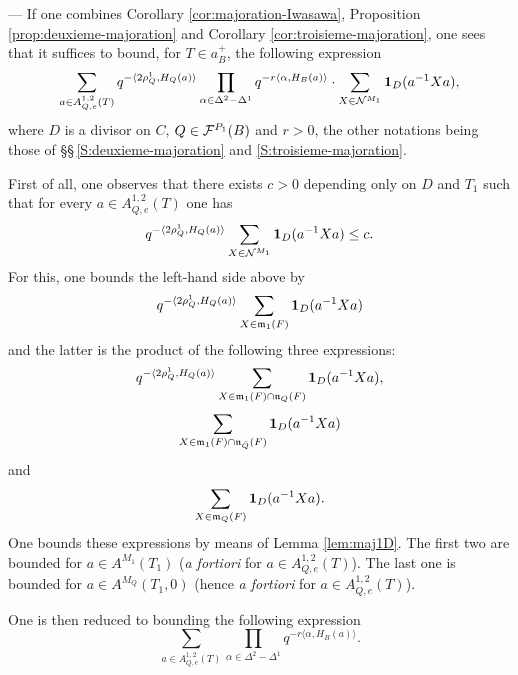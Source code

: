 \begin{paragr} --- \label{S:preuve-prop641} If one combines Corollary \ref{cor:majoration-Iwasawa}, Proposition \ref{prop:deuxieme-majoration} and Corollary \ref{cor:troisieme-majoration}, one sees that it suffices to bound, for $T\in a_B^+$, the following expression
$$\sum_{a\in A^{1,2}_{Q,e}(T)} q^{-\langle 2\rho_Q^1,H_Q(a)\rangle} \prod_{\alpha\in \Delta^2-\Delta^1} q^{-r\langle \alpha,H_B(a)\rangle}\cdot \sum_{X\in \mathcal{N}^{M_1}} \mathbf{1}_D(a^{-1}Xa),$$
where $D$ is a divisor on $C$, $Q\in \mathcal{F}^{P_1}(B)$ and $r>0$, the other notations being those of \S\S\,\ref{S:deuxieme-majoration} and \ref{S:troisieme-majoration}.

First of all, one observes that there exists $c>0$ depending only on $D$ and $T_1$ such that for every $a\in A^{1,2}_{Q,e}(T)$ one has
$$q^{-\langle 2\rho_Q^1,H_Q(a)\rangle} \sum_{X\in \mathcal{N}^{M_1}} \mathbf{1}_D(a^{-1}Xa)\leq c.$$
For this, one bounds the left-hand side above by
$$q^{-\langle 2\rho_Q^1,H_Q(a)\rangle} \sum_{X\in \mathfrak{m}_1(F)} \mathbf{1}_D(a^{-1}Xa)$$
and the latter is the product of the following three expressions:
\begin{equation}
  \label{eq:terme-A}
  q^{-\langle 2\rho_Q^1,H_Q(a)\rangle} \sum_{X\in \mathfrak{m}_1(F)\cap \mathfrak{n}_Q(F)} \mathbf{1}_D(a^{-1}Xa),
\end{equation}
\begin{equation}
  \label{eq:terme-B}
  \sum_{X\in \mathfrak{m}_1(F)\cap \mathfrak{n}_{\bar{Q}}(F)} \mathbf{1}_D(a^{-1}Xa)
\end{equation}
and
\begin{equation}
  \label{eq:terme-C}
  \sum_{X\in \mathfrak{m}_Q(F)} \mathbf{1}_D(a^{-1}Xa).
\end{equation}
One bounds these expressions by means of Lemma \ref{lem:maj1D}. The first two are bounded for $a\in A^{M_1}(T_1)$ (\emph{a fortiori} for $a\in A^{1,2}_{Q,e}(T)$). The last one is bounded for $a\in A^{M_Q}(T_1,0)$ (hence \emph{a fortiori} for $a\in A^{1,2}_{Q,e}(T)$).

One is then reduced to bounding the following expression
$$\sum_{a\in A^{1,2}_{Q,e}(T)} \prod_{\alpha\in \Delta^2-\Delta^1} q^{-r\langle \alpha,H_B(a)\rangle}.$$


\end{paragr}
